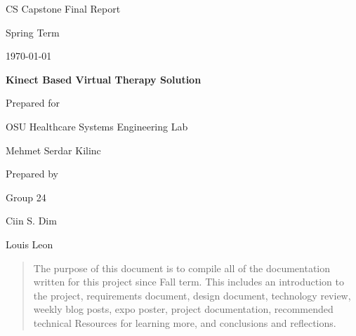 \documentclass[onecolumn, draftclsnofoot,10pt, compsoc]{IEEEtran}
\def \CapstoneTeamName{     TeamName}
\def \CapstoneTeamNumber{       24}
\def \GroupMemberOne{            Ciin S. Dim}
\def \GroupMemberTwo{           Louis Leon}
\def \CapstoneProjectName{      Kinect Based Virtual Therapy Solution}
\def \CapstoneSponsorCompany{   OSU Healthcare Systems Engineering Lab}
\def \CapstoneSponsorPerson{        Mehmet Serdar Kilinc}
\def \DocType{      %
                Final Report
                }
\newcommand{\NameSigPair}[1]{\par
\makebox[2.75in][r]{#1} \hfil   \makebox[3.25in]{\makebox[2.25in]{\hrulefill} \hfill        \makebox[.75in]{\hrulefill}}
\par\vspace{-12pt} \textit{\tiny\noindent
\makebox[2.75in]{} \hfil        \makebox[3.25in]{\makebox[2.25in][r]{Signature} \hfill  \makebox[.75in][r]{Date}}}}
\renewcommand{\NameSigPair}[1]{#1}
\begin{document}
\begin{titlepage}
    \begin{singlespace}
        \hfill 
        \par\vspace{.2in}
        \centering
        \scshape{
            \huge CS Capstone\DocType \par
            {\large Spring Term}\par
            {\large\today}\par
            \vspace{.5in}
            \textbf{\Huge\CapstoneProjectName}\par
            \vfill
            {\large Prepared for}\par
            \Huge \CapstoneSponsorCompany\par
            \vspace{5pt}
            {\Large\NameSigPair{\CapstoneSponsorPerson}\par}
            {\large Prepared by }\par
            Group\CapstoneTeamNumber\par
            \vspace{5pt}
            {\Large
                \NameSigPair{\GroupMemberOne}\par
                \NameSigPair{\GroupMemberTwo}\par
            }
            \vspace{20pt}
        }
        \begin{abstract}
        The purpose of this document is to compile all of the documentation written for this project since Fall term. This includes an introduction to the project, requirements document, design document, technology review, weekly blog posts, expo poster, project documentation, recommended technical Resources for learning more, and conclusions and reflections.
    \end{abstract}     
    \end{singlespace}
\end{titlepage}
\newpage
{}
\tableofcontents
\listoffigures
\clearpage
\end{document}
